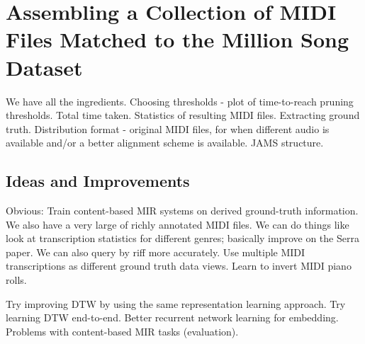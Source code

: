 \chapter{Assembling a Collection of MIDI Files Matched to the Million Song Dataset}
\label{ch:assembling}

We have all the ingredients.
Choosing thresholds - plot of time-to-reach pruning thresholds.
Total time taken.
Statistics of resulting MIDI files.
Extracting ground truth.
Distribution format - original MIDI files, for when different audio is available and/or a better alignment scheme is available.
JAMS structure.

\section{Ideas and Improvements}

Obvious: Train content-based MIR systems on derived ground-truth information.
We also have a very large of richly annotated MIDI files.
We can do things like look at transcription statistics for different genres; basically improve on the Serra paper.
We can also query by riff more accurately.
Use multiple MIDI transcriptions as different ground truth data views.
Learn to invert MIDI piano rolls.

Try improving DTW by using the same representation learning approach.
Try learning DTW end-to-end.
Better recurrent network learning for embedding.
Problems with content-based MIR tasks (evaluation).
